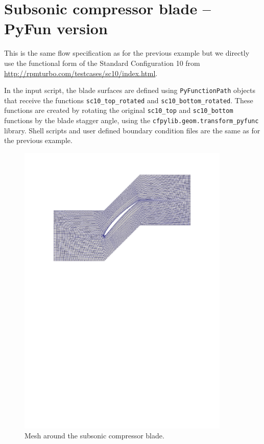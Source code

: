 
\section{Subsonic compressor blade -- PyFun version}
%
This is the same flow specification as for the previous example but we directly 
use the functional form of the Standard Configuration 10 from \url{http://rpmturbo.com/testcases/sc10/index.html}.

In the input script, the blade surfaces are defined using \texttt{PyFunctionPath} 
objects that receive the functions \texttt{sc10\_top\_rotated} and 
\texttt{sc10\_bottom\_rotated}. These functions are created by rotating the original 
\texttt{sc10\_top} and \texttt{sc10\_bottom} functions by the blade stagger angle, 
using the \texttt{cfpylib.geom.transform\_pyfunc} library. Shell scripts and 
user defined boundary condition files are the same as for the previous example.

\begin{figure}[htbp]
\begin{center}
\includegraphics[width=0.9\textwidth,viewport=24 495 570 817]{../2D/turbo_sc10_parametric/mesh.pdf}
\end{center}
\caption{Mesh around the subsonic compressor blade.}
\label{turbo-sc10-parametric-meshfig}
\end{figure}

